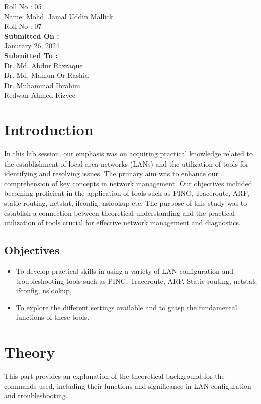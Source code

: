 \documentclass[11pt]{article}
\begin{document}
\begin{titlepage}
\begin{center}
\begin{large}
				Roll No : 05\\[12pt]
				Name: Mohd. Jamal Uddin Mallick\\[8pt]
				Roll No : 07\\[12pt]
				\textbf{Submitted On : \\[12pt]}
				Janurary 26, 2024\\[20pt]
				\textbf{Submitted To :\\[12pt]}
				Dr. Md. Abdur Razzaque\\[12pt]
                Dr. Md. Mamun Or Rashid\\[12pt]
                Dr. Muhammad Ibrahim\\[12pt]
                Redwan Ahmed Rizvee
			\end{large}
		\end{center}  	
\end{titlepage}

\section{Introduction}

In this lab session, our emphasis was on acquiring practical knowledge related to the establishment of local area networks (LANs) and the utilization of tools for identifying and resolving issues. The primary aim was to enhance our comprehension of key concepts in network management. Our objectives included becoming proficient in the application of tools such as PING, Traceroute, ARP, static routing, netstat, ifconfig, nslookup etc. The purpose of this study was to establish a connection between theoretical understanding and the practical utilization of tools crucial for effective network management and diagnostics.


\subsection{Objectives}
\begin{itemize}
    \item To develop practical skills in using a variety of LAN configuration and troubleshooting tools such as PING, Traceroute, ARP, Static routing, netstat, ifconfig, nslookup, 
    \item To explore the different settings available and to grasp the fundamental functions of these tools.
\end{itemize}
\section{Theory}
This part provides an explanation of the theoretical background for the commands used, including their functions and significance in LAN configuration and troubleshooting.
\end{document}
